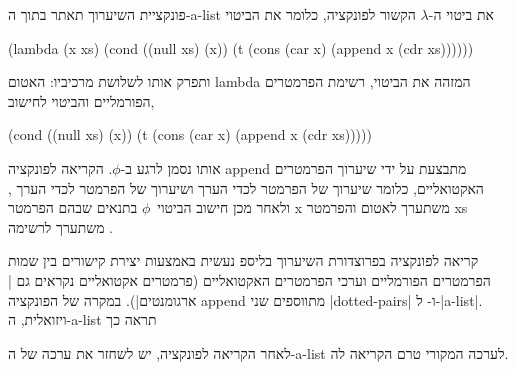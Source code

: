 פונקציית השיערוך תאתר בתוך ה-a-list את ביטוי ה-$λ$ הקשור לפונקציה, כלומר
את הביטוי
\begin{LISP}
(lambda
  (x xs)
  (cond ((null xs) (x))
        (t (cons
              (car x)
              (append x (cdr xs))))))
\end{LISP}
ותפרק אותו לשלושת
מרכיביו: האטום lambda המזהה את הביטוי, רשימת הפרמטרים הפורמליים 
והביטוי לחישוב,
\begin{LISP}
(cond ((null xs) (x))
      (t (cons
            (car x)
            (append x (cdr xs)))))
\end{LISP}
אותו נסמן לרגע ב-$ϕ$. הקריאה לפונקציה append מתבצעת על ידי שיערוך הפרמטרים
האקטואליים, כלומר שיערוך של הפרמטר  לכדי הערך  ושיערוך של
הפרמטר  לכדי הערך , ולאחר מכן חישוב הביטוי~$ϕ$ בתנאים
שבהם הפרמטר x משתערך לאטום  והפרמטר xs משתערך לרשימה .

קריאה לפונקציה בפרוצדורת השיערוך בליספ נעשית באמצעות יצירת קישורים בין שמות
הפרמטרים הפורמליים וערכי הפרמטרים האקטואליים (פרמטרים אקטואליים נקראים גם
\ע|ארגומנטים|). במקרה של הפונקציה append מתווספים שני \E|dotted-pairs|
 ו- ל-\E|a-list|.
ויזואלית, ה-a-list תראה כך
\begin{LTR}
\end{LTR}
לאחר הקריאה לפונקציה, יש לשחזר את ערכה של ה-a-list לערכה המקורי טרם הקריאה לה.


